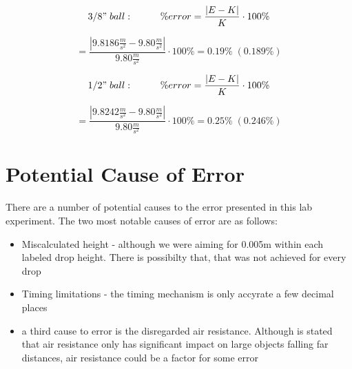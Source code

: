 \newpage

\begin{equation*}
  3/8" \; ball: \hspace{1cm} \%error = \frac{|E - K|}{K} \cdot 100\%
\end{equation*}

\begin{equation*}
  = \frac{|9.8186\frac{m}{s^2} - 9.80\frac{m}{s^2}|}{9.80\frac{m}{s^2}} \cdot 100\% = 0.19\% \; (0.189\%)
\end{equation*}

\begin{equation*}
  1/2" \; ball: \hspace{1cm} \%error = \frac{|E - K|}{K} \cdot 100\%
\end{equation*}

\begin{equation*}
  = \frac{|9.8242\frac{m}{s^2} - 9.80\frac{m}{s^2}|}{9.80\frac{m}{s^2}} \cdot 100\% = 0.25\% \; (0.246\%)
\end{equation*}

\section{Potential Cause of Error}
There are a number of potential causes to the error presented in this lab 
experiment. The two most notable causes of error are as follows:
\begin{itemize}
  \item Miscalculated height - although we were aiming for 0.005m within each labeled
    drop height. There is possibilty that, that was not achieved for every drop
  \item Timing limitations - the timing mechanism is only accyrate a few decimal places
  \item a third cause to error is the disregarded air resistance. Although is stated 
    that air resistance only has significant impact on large objects falling far distances,
    air resistance could be a factor for some error
\end{itemize}
    
